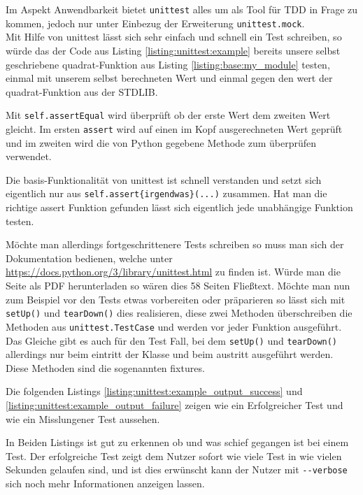 Im Aspekt Anwendbarkeit bietet \lstinline|unittest| alles um als Tool für TDD in
Frage zu kommen, jedoch nur unter Einbezug der Erweiterung \lstinline|unittest.mock|.
\newline
\\
Mit Hilfe von unittest lässt sich sehr einfach und schnell ein Test schreiben,
so würde das der Code aus Listing \ref{listing:unittest:example} bereits unsere 
selbst geschriebene quadrat-Funktion aus Listing \ref{listing:base:my_module} testen,
einmal mit unserem selbst berechneten Wert und einmal gegen den wert der quadrat-Funktion
aus der STDLIB.

Mit \lstinline{self.assertEqual} wird überprüft ob der erste Wert dem zweiten Wert
gleicht. Im ersten \lstinline{assert} wird auf einen im Kopf ausgerechneten Wert
geprüft und im zweiten wird die von Python gegebene Methode zum überprüfen verwendet.

Die basis-Funktionalität von unittest ist schnell verstanden und setzt sich
eigentlich nur aus \lstinline|self.assert{irgendwas}(...)| zusammen. Hat man die
richtige assert Funktion gefunden lässt sich eigentlich jede unabhängige
Funktion testen.

Möchte man allerdings fortgeschrittenere Tests schreiben so muss man sich der
Dokumentation bedienen, welche unter \url{https://docs.python.org/3/library/unittest.html}
zu finden ist. Würde man die Seite als PDF herunterladen so wären dies 58
Seiten Fließtext. Möchte man nun zum Beispiel vor den Tests etwas vorbereiten
oder präparieren so lässt sich mit \lstinline|setUp()| und \lstinline|tearDown()| dies realisieren,
diese zwei Methoden überschreiben die Methoden aus \lstinline|unittest.TestCase| und
werden vor jeder Funktion ausgeführt. Das Gleiche gibt es auch für den Test Fall, bei dem
\lstinline|setUp()| und \lstinline|tearDown()| allerdings nur beim eintritt der Klasse und beim
austritt ausgeführt werden. Diese Methoden sind die sogenannten \Glspl{fixture}.

Die folgenden Listings \ref{listing:unittest:example_output_success} und
\ref{listing:unittest:example_output_failure} zeigen wie ein Erfolgreicher Test
und wie ein Misslungener Test aussehen.

In Beiden Listings ist gut zu erkennen ob und was schief gegangen ist bei einem Test.
Der erfolgreiche Test zeigt dem Nutzer sofort wie viele Test in wie vielen Sekunden gelaufen
sind, und ist dies erwünscht kann der Nutzer mit \lstinline|--verbose| sich noch mehr
Informationen anzeigen lassen.

